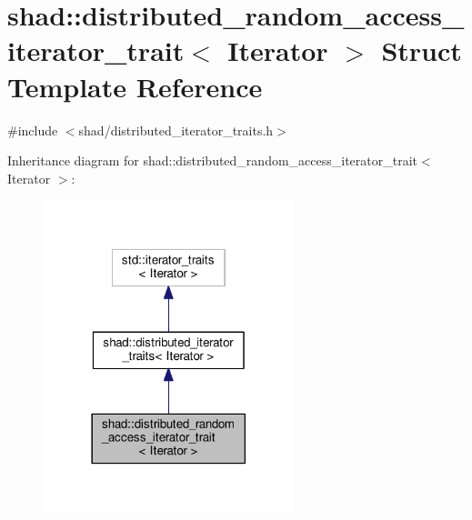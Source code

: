 \hypertarget{structshad_1_1distributed__random__access__iterator__trait}{\section{shad\-:\-:distributed\-\_\-random\-\_\-access\-\_\-iterator\-\_\-trait$<$ Iterator $>$ Struct Template Reference}
\label{structshad_1_1distributed__random__access__iterator__trait}
}


{\ttfamily \#include $<$shad/distributed\-\_\-iterator\-\_\-traits.\-h$>$}



Inheritance diagram for shad\-:\-:distributed\-\_\-random\-\_\-access\-\_\-iterator\-\_\-trait$<$ Iterator $>$\-:
\nopagebreak
\begin{figure}[H]
\begin{center}
\leavevmode
\includegraphics[width=206pt]{structshad_1_1distributed__random__access__iterator__trait__inherit__graph}
\end{center}
\end{figure}


